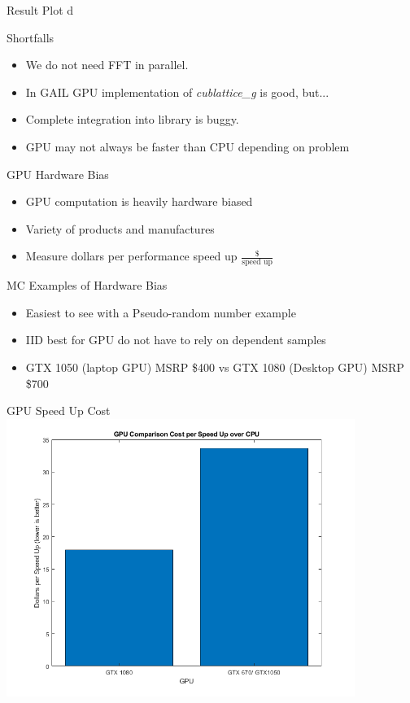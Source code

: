 \documentclass[11pt]{beamer}
\begin{document}
\begin{frame}{Result Plot}
d
\end{frame}

\begin{frame}{Shortfalls}
\begin{itemize}
\item We do not need FFT in parallel.
\item In GAIL GPU implementation of \textit{cublattice\_g} is good, but...
\item Complete integration into library is buggy.
\item GPU may not always be faster than CPU depending on problem
\end{itemize}
\end{frame}

\begin{frame}{GPU Hardware Bias}
\begin{itemize}
\item GPU computation is heavily hardware biased
\item Variety of products and manufactures
\item Measure dollars per performance speed up $\frac{\$}{\text{speed up}}$
\end{itemize}
\end{frame}

\begin{frame}{MC Examples of Hardware Bias}%
\begin{itemize}
\item Easiest to see with a Pseudo-random number example
\item IID best for GPU do not have to rely on dependent samples
\item GTX 1050 (laptop GPU) MSRP \$400 vs GTX 1080 (Desktop GPU) MSRP \$700
\end{itemize}
\end{frame}

\begin{frame}{GPU Speed Up Cost}
\centering
\includegraphics[width=0.85\textwidth]{gpuspeedup.png} 
\end{frame}
\end{document}

